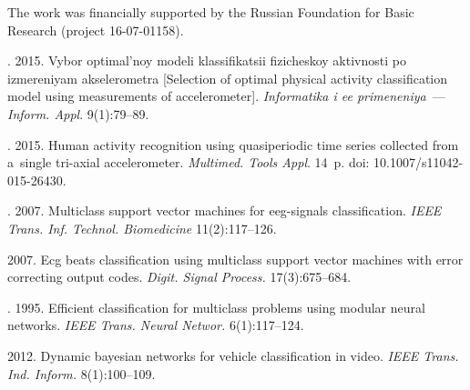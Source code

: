 


\Ack
\noindent
The work was financially supported by the Russian Foundation
for Basic Research (project 16-07-01158).



  \begin{multicols}{2}

\renewcommand{\bibname}{\protect\rmfamily References}

{\small\frenchspacing
 {%
 \begin{thebibliography}{99}

.
2015.
Vybor optimal'noy modeli klassifikatsii fizicheskoy aktivnosti po izmereniyam
  akselerometra [Selection of optimal physical activity
  classification model using measurements of accelerometer].
\textit{Informatika i ee primeneniya}~--- \textit{Inform. Appl}.
9(1):79--89.

.
2015.
Human activity recognition using quasiperiodic time series collected from 
a~single tri-axial accelerometer.
\textit{Multimed. Tools  Appl}. 14~p.
  doi: 10.1007/s11042-015-26430.

.
2007.
Multiclass support vector machines for eeg-signals classification.
\textit{IEEE Trans. Inf. Technol. Biomedicine}
11(2):117--126.

2007.
Ecg beats classification using multiclass support vector machines with error
  correcting output codes.
\textit{Digit. Signal Process.} 17(3):675--684.

.
1995.
Efficient classification for multiclass problems using modular neural networks.
\textit{IEEE Trans. Neural Networ.} 6(1):117--124.

2012. Dynamic bayesian networks for vehicle classification in video.
\textit{IEEE Trans. Ind. Inform.} 8(1):100--109.


\end{thebibliography}}}
\end{multicols}
